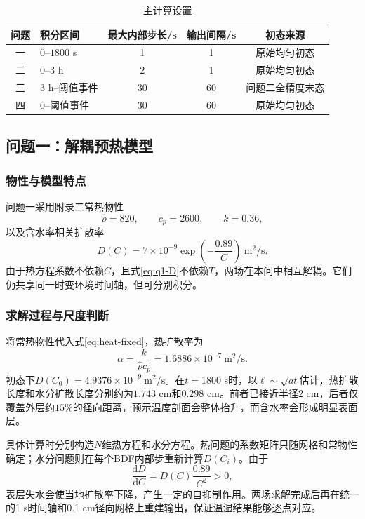 \begin{table}[htbp]
  \caption{主计算设置}
  \label{tab:numerical-settings}
  \centering
  \begin{tabular}{clccc}
    \toprule
    问题 & 积分区间 & 最大内部步长/s & 输出间隔/s & 初态来源 \\
    \midrule
    一 & $0$--$1800$ s & 1 & 1 & 原始均匀初态 \\
    二 & $0$--$3$ h & 2 & 1 & 原始均匀初态 \\
    三 & $3$ h--阈值事件 & 30 & 60 & 问题二全精度末态 \\
    四 & $0$--阈值事件 & 30 & 60 & 原始均匀初态 \\
    \bottomrule
  \end{tabular}
\end{table}

\subsection{问题一：解耦预热模型}

\subsubsection{物性与模型特点}

问题一采用附录二常热物性
\[
\hat\rho=820,\qquad c_p=2600,\qquad k=0.36,
\]
以及含水率相关扩散率
\begin{equation}
D(C)=7\times10^{-9}\exp\left(-\frac{0.89}{C}\right)\ \mathrm{m^2/s}.
\label{eq:q1-D}
\end{equation}
由于热方程系数不依赖$C$，且式\eqref{eq:q1-D}不依赖$T$，两场在本问中相互解耦。它们仍共享同一时变环境时间轴，但可分别积分。

\subsubsection{求解过程与尺度判断}

将常热物性代入式\eqref{eq:heat-fixed}，热扩散率为
\begin{equation}
\alpha=\frac{k}{\hat\rho c_p}=1.6886\times10^{-7}\ \mathrm{m^2/s}.
\end{equation}
初态下$D(C_0)=4.9376\times10^{-9}\ \mathrm{m^2/s}$。在$t=1800$ s时，以$\ell\sim\sqrt{at}$估计，热扩散长度和水分扩散长度分别约为$1.743$ cm和$0.298$ cm。前者已接近半径$2$ cm，后者仅覆盖外层约$15\%$的径向距离，预示温度剖面会整体抬升，而含水率会形成明显表面层。

具体计算时分别构造$N$维热方程和水分方程。热问题的系数矩阵只随网格和常物性确定；水分问题则在每个BDF内部步重新计算$D(C_i)$。由于
\begin{equation}
\frac{\mathrm dD}{\mathrm dC}=D(C)\frac{0.89}{C^2}>0,
\end{equation}
表层失水会使当地扩散率下降，产生一定的自抑制作用。两场求解完成后再在统一的1 s时间轴和0.1 cm径向网格上重建输出，保证温湿结果能够逐点对应。


